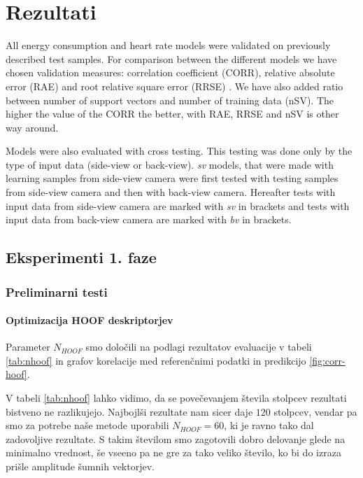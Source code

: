 \chapter{Rezultati}\label{sec:rezultati}
All energy consumption and heart rate models were validated on previously described test samples. For comparison between the different models we have chosen validation measures: correlation coefficient (CORR), relative absolute error (RAE) and root relative square error (RRSE) \cite{witten2005data}. We have also added ratio between number of support vectors and number of training data (nSV). The higher the value of the CORR the better, with RAE, RRSE and nSV is other way around.

Models were also evaluated with cross testing. This testing was done only by the type of input data (side-view or back-view). \textit{sv} models, that were made with learning samples from side-view camera were first tested with testing samples from side-view camera and then with back-view camera. Hereafter tests with input data from side-view camera are marked with \textit{sv} in brackets and tests with input data from back-view camera are marked with \textit{bv} in brackets.


















\section{Eksperimenti 1. faze}


\subsection{Preliminarni testi}

\subsubsection{Optimizacija HOOF deskriptorjev}\label{sec:rezultati-optimizacija-hoof}
Parameter $N_{HOOF}$ smo določili na podlagi rezultatov evaluacije v tabeli \ref{tab:nhoof} in grafov korelacije med referenčnimi podatki in predikcijo \ref{fig:corr-hoof}.

V tabeli \ref{tab:nhoof} lahko vidimo, da se povečevanjem števila stolpcev rezultati bistveno ne razlikujejo. Najbojlši rezultate nam sicer daje $120$ stolpcev, vendar pa smo za potrebe naše metode uporabili $N_{HOOF}=60$, ki je ravno tako dal zadovoljive rezultate. S takim številom smo zagotovili dobro delovanje glede na minimalno vrednost, še vseeno pa ne gre za tako veliko število, ko bi do izraza prišle amplitude šumnih vektorjev.

